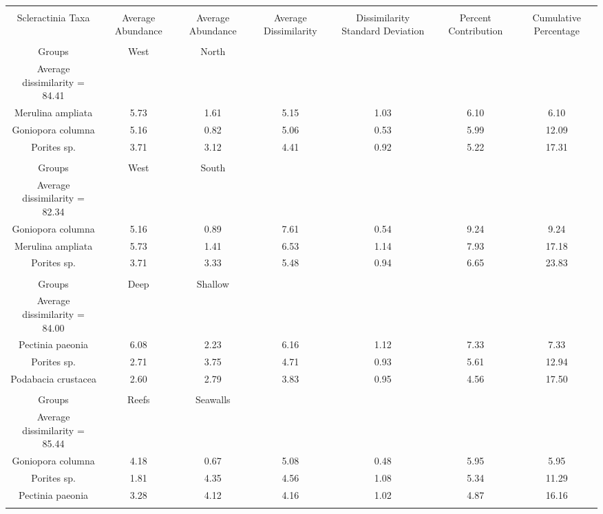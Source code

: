 \documentclass{article}
\begin{document}
\begin{table}[!htbp] \centering 
  \caption*{} 
  \label{} 
\begin{tabular}{@{\extracolsep{5pt}} ccccccc} 
\\[-1.8ex]\hline 
\hline \\[-1.8ex] 
Scleractinia Taxa & Average Abundance	&  Average Abundance & Average Dissimilarity & Dissimilarity Standard Deviation & Percent Contribution & Cumulative Percentage\\
\hline \\[-1.8ex] 
Groups   &  West & North\\
Average dissimilarity = 84.41\\
Merulina ampliata	&      5.73	 &      1.61	 &  5.15	 &  1.03	  &  6.10	& 6.10\\
Goniopora columna	&      5.16	   &    0.82	 &  5.06	  & 0.53	&    5.99	&12.09\\
Porites sp.	 &     3.71	   &    3.12	&   4.41	&   0.92	   & 5.22&	17.31\\

\hline\\[-1.8ex] 
Groups &West & South\\
Average dissimilarity = 82.34\\
Goniopora columna	&      5.16	  &     0.89	&   7.61	  & 0.54	&    9.24	& 9.24\\
Merulina ampliata	  &    5.73	&       1.41	  & 6.53	&   1.14	&    7.93&	17.18\\
Porites sp. &      3.71	&       3.33	 &  5.48	 &  0.94	   & 6.65&	23.83\\

\hline\\[-1.8ex] 
Groups& Deep  &  Shallow\\
Average dissimilarity = 84.00\\
Pectinia paeonia	    &  6.08	      &   2.23	&   6.16	   &1.12	&    7.33	& 7.33\\
Porites sp.	     & 2.71	       &  3.75	 &  4.71	 &  0.93	  &  5.61&	12.94\\
Podabacia crustacea    & 2.60	      &   2.79	  & 3.83	&   0.95	&    4.56	&17.50\\
\hline\\[-1.8ex] 
Groups& Reefs  &  Seawalls\\
Average dissimilarity = 85.44\\
Goniopora columna  &4.18	  &        0.67	&   5.08	&   0.48	&    5.95	& 5.95\\
Porites sp.       &1.81	     &     4.35	&   4.56	&   1.08	  &  5.34&	11.29\\
Pectinia paeonia &	       3.28	 &         4.12	 &  4.16	 &  1.02	 &   4.87&	16.16\\


\hline \\[-1.8ex] 
\end{tabular} 
\end{table} 
\end{document}
